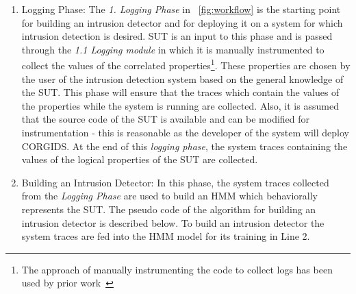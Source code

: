 \begin{enumerate}
\item {Logging Phase}: The \textit{1. Logging Phase} in ~\autoref{fig:workflow} is the starting point for building an intrusion detector and for deploying it on a system for which intrusion detection is desired. SUT is an input to this phase and is passed through the \textit{1.1 Logging module} in which it is manually instrumented to collect the values of the correlated properties\footnote{The approach of manually instrumenting the code to collect logs has been used by prior work~\cite{chen2018learning,aliabadi2017artinali}}. These properties are chosen by the user of the intrusion detection system based on the general knowledge of the SUT. This phase will ensure that the traces which contain the values of the properties while the system is running are collected. Also, it is assumed that the source code of the SUT is available and can be modified for instrumentation - this is reasonable as the developer of the system will deploy CORGIDS. At the end of this \textit{logging phase}, the system traces containing the values of the logical properties of the SUT are collected.

\item {Building an Intrusion Detector}: In this phase, the system traces collected from the \textit{Logging Phase} are used to build an HMM which behaviorally represents the SUT. The pseudo code of the algorithm for building an intrusion detector is described below. To build an intrusion detector the system traces are fed into the HMM model for its training in Line 2.

\end{enumerate}
